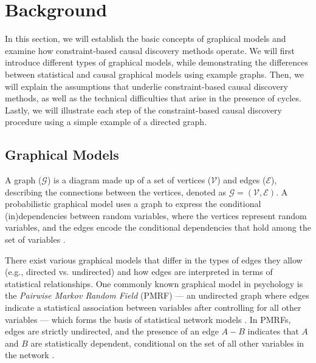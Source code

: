 \documentclass[twoside, 11pt]{article}
\begin{document}



\section{Background}
In this section, we will establish the basic concepts of graphical models and examine how constraint-based causal discovery methods operate. We will first introduce different types of graphical models, while demonstrating the differences between statistical and causal graphical models using example graphs. Then, we will explain the assumptions that underlie constraint-based causal discovery methods, as well as the technical difficulties that arise in the presence of cycles. Lastly, we will illustrate each step of the constraint-based causal discovery procedure using a simple example of a directed graph.


\subsection{Graphical Models} 

A graph ($\mathcal{G}$) is a diagram made up of a set of vertices ($\mathcal{V}$) and edges ($\mathcal{E}$), describing the connections between the vertices, denoted as $\mathcal{G} = (\mathcal{V},  \mathcal{E})$.
A probabilistic graphical model uses a graph to express the conditional (in)dependencies between random variables, where the vertices represent random variables, and the edges encode the conditional dependencies that hold among the set of variables \citep{lauritzen1996graphical}. 


There exist various graphical models that differ in the types of edges they allow (e.g., directed vs. undirected) and how edges are interpreted in terms of statistical relationships. One commonly known graphical model in psychology is the \textit{Pairwise Markov Random Field} (PMRF) --- an undirected graph where edges indicate a statistical association between variables after controlling for all other variables ---  which forms the basis of statistical network models \citep{epskamp_gaussian_2018, epskamp_tutorial_2018}. In PMRFs, edges are strictly undirected, and the presence of an edge $A-B$ indicates that $A$ and $B$ are statistically dependent, conditional on the set of all other variables in the network \citep{borsboom_network_2021}. 
\end{document}
